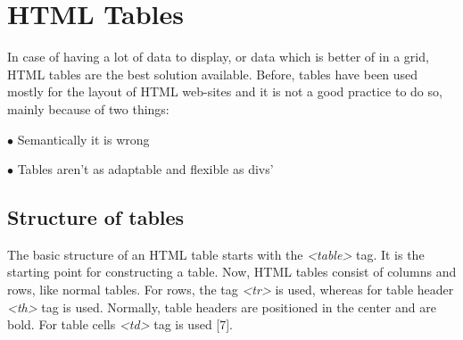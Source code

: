%
%
% 
% 
% 


\chapter{HTML Tables}

\label{HTML5 Tables}

In case of having a lot of data to display, or data which is better of in a grid, HTML tables
are the best solution available. Before, tables have been used mostly for the layout of 
HTML web-sites and it is not a good practice to do so, mainly because of two things:


$\bullet$ Semantically it is wrong

$\bullet$ Tables aren't as adaptable and flexible as divs'

\section{Structure of tables}

The basic structure of an HTML table starts with the \textit{<table>} tag. It is the starting
point for constructing a table. Now, HTML tables consist of columns and rows, like normal
tables. For rows, the tag  \textit{<tr>} is used, whereas for table header \textit{<th>} tag
is used. Normally, table headers are positioned in the center and are bold. For table cells
\textit{<td>} tag is used [7]. 

